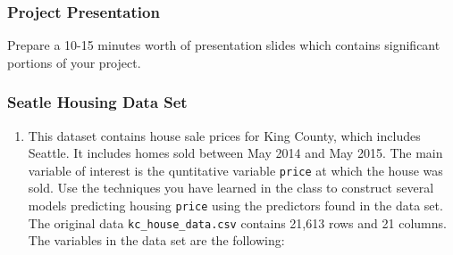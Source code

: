 \documentclass[]{article}
\providecommand{\tightlist}{%
  \setlength{\itemsep}{0pt}\setlength{\parskip}{0pt}}
\begin{document}
\subsubsection{Project Presentation}\label{project-presentation}

Prepare a 10-15 minutes worth of presentation slides which contains
significant portions of your project.

\subsubsection{Seatle Housing Data Set}\label{seatle-housing-data-set}

\begin{enumerate}
\def\labelenumi{\alph{enumi})}
\tightlist
\item
  This dataset contains house sale prices for King County, which
  includes Seattle. It includes homes sold between May 2014 and May
  2015. The main variable of interest is the quntitative variable
  \texttt{price} at which the house was sold. Use the techniques you
  have learned in the class to construct several models predicting
  housing \texttt{price} using the predictors found in the data set. The
  original data \texttt{kc\_house\_data.csv} contains 21,613 rows and 21
  columns. The variables in the data set are the following:
\end{enumerate}
\end{document}
